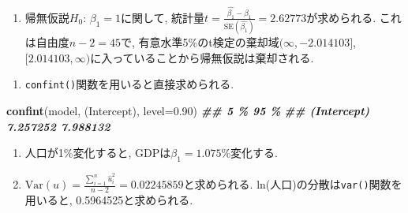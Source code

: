 \documentclass[
]{book}
\newenvironment{Shaded}{\begin{snugshade}}{\end{snugshade}}
\newcommand{\AttributeTok}[1]{\textcolor[rgb]{0.13,0.29,0.53}{#1}}
\newcommand{\CommentTok}[1]{\textcolor[rgb]{0.56,0.35,0.01}{\textit{#1}}}
\newcommand{\DecValTok}[1]{\textcolor[rgb]{0.00,0.00,0.81}{#1}}
\newcommand{\DocumentationTok}[1]{\textcolor[rgb]{0.56,0.35,0.01}{\textbf{\textit{#1}}}}
\newcommand{\FloatTok}[1]{\textcolor[rgb]{0.00,0.00,0.81}{#1}}
\newcommand{\FunctionTok}[1]{\textcolor[rgb]{0.13,0.29,0.53}{\textbf{#1}}}
\newcommand{\NormalTok}[1]{#1}
\newcommand{\OtherTok}[1]{\textcolor[rgb]{0.56,0.35,0.01}{#1}}
\newcommand{\SpecialCharTok}[1]{\textcolor[rgb]{0.81,0.36,0.00}{\textbf{#1}}}
\newcommand{\StringTok}[1]{\textcolor[rgb]{0.31,0.60,0.02}{#1}}
\providecommand{\tightlist}{%
  \setlength{\itemsep}{0pt}\setlength{\parskip}{0pt}}
\begin{document}
\begin{enumerate}
\def\labelenumi{(\arabic{enumi})}
\setcounter{enumi}{1}
\tightlist
\item
  帰無仮説\(H_0\): \(\beta_1 = 1\)に関して, 統計量\(t = \frac{\hat{\beta_1} - \beta_1}{\text{SE}(\hat{\beta_1})} = 2.62773\)が求められる.
  これは自由度\(n-2 = 45\)で, 有意水準5\%のt検定の棄却域\((\infty, -2.014103]\), \([2.014103, \infty)\)に入っていることから帰無仮説は棄却される.
\end{enumerate}

\begin{Shaded}
\end{Shaded}

\begin{enumerate}
\def\labelenumi{(\arabic{enumi})}
\setcounter{enumi}{2}
\tightlist
\item
  \texttt{confint()}関数を用いると直接求められる.
\end{enumerate}

\begin{Shaded}
\begin{Highlighting}[]
\FunctionTok{confint}\NormalTok{(model, }\StringTok{\textquotesingle{}(Intercept)\textquotesingle{}}\NormalTok{, }\AttributeTok{level=}\FloatTok{0.90}\NormalTok{)}
\DocumentationTok{\#\#                  5 \%     95 \%}
\DocumentationTok{\#\# (Intercept) 7.257252 7.988132}
\end{Highlighting}
\end{Shaded}

\begin{enumerate}
\def\labelenumi{(\arabic{enumi})}
\setcounter{enumi}{3}
\item
  人口が1\%変化すると, GDPは\(\beta_1 = 1.075\)\%変化する.
\item
  \(\text{Var}(u) = \frac{\sum_{i=1}^n \hat{u}_i^2}{n-2} = 0.02245859\)と求められる.
  ln(人口)の分散は\texttt{var()}関数を用いると, 0.5964525と求められる.
\end{enumerate}
\end{document}
